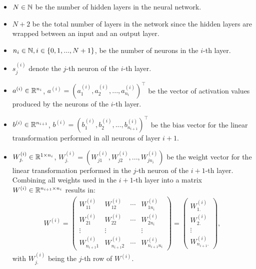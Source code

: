 \begin{itemize}
	\item $N \in \mathbb{N}$ be the number of hidden layers in the neural network.
	
	\item $N + 2$ be the total number of layers in the network since the hidden layers are wrapped between an input and an output layer. 
	
	\item $n_i \in \mathbb{N}, i \in \{0, 1, ..., N+1\}$, be the number of neurons in the $i$-th layer.
	
	\item $s_j^{(i)}$ denote the $j$-th neuron of the $i$-th layer. 
	
	\item $a^{(i)} \in \mathbb{R}^{n_i}$, $a^{(i)} = (a_1^{(i)}, a_2^{(i)}, ..., a_{n_i}^{(i)})^\top$ be the vector of activation values produced by the neurons of the $i$-th layer.
	
	\item $b^{(i)} \in \mathbb{R}^{n_{i+1}}$, $b^{(i)} = (b_1^{(i)}, b_2^{(i)}, ..., b_{n_{i+1}}^{(i)})^\top$ be the bias vector for the linear transformation performed in all neurons of layer $i+1$.

	\item $W_{j.}^{(i)} \in \mathbb{R}^{1 \times n_i}$, $W_{j.}^{(i)} = (W_{j1}^{(i)}, W_{j2}^{(i)}, ..., W_{jn_i}^{(i)})$ be the weight vector for the linear transformation performed in the $j$-th neuron of the $i+1$-th layer. Combining all weights used in the $i+1$-th layer into a matrix $W^{(i)} \in \mathbb{R}^{n_{i+1} \times n_i}$ results in:	
		\begin{align*}
		W^{(i)} = 
		\begin{pmatrix}
		W_{11}^{(i)}		& W_{12}^{(i)}		 	& \cdots 	& W_{1n_i}^{(i)}	 \\
		W_{21}^{(i)}		& W_{22}^{(i)}			& \cdots 	& W_{2n_i}^{(i)} 	\\
		\vdots 				& \vdots 		 	 	&			& \vdots 		\\
		W_{n_{i+1}1}^{(i)}	& W_{n_{i+1}2}^{(i)}	& \cdots 	& W_{n_{i+1}n_i}^{(i)} 
		\end{pmatrix}
		= 
		\begin{pmatrix}
		W_{1.}^{(i)}\\
		W_{2.}^{(i)}\\
		\vdots \\
		W_{n_{i+1}.}^{(i)} 
		\end{pmatrix},
		\end{align*}		
	with $W_{j.}^{(i)}$ being the $j$-th row of $W^{(i)}$.
	

\end{itemize}
